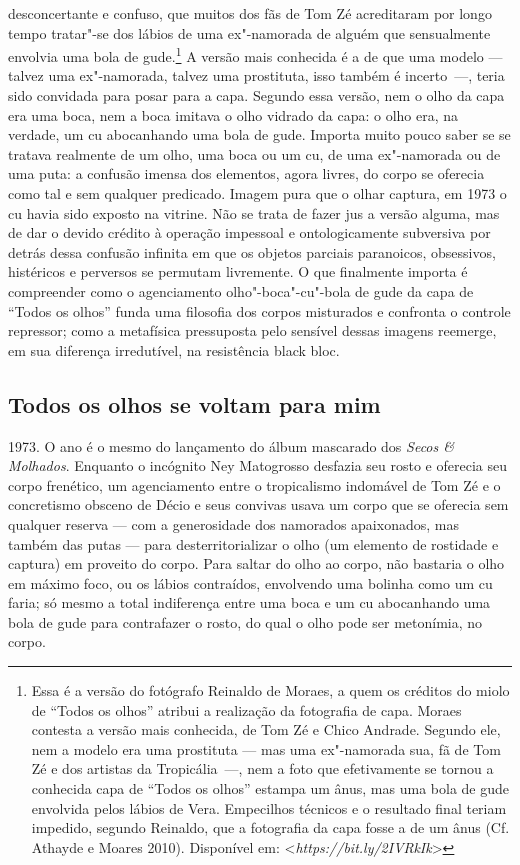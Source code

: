 desconcertante e confuso, que muitos dos fãs de Tom Zé acreditaram por
longo tempo tratar"-se dos lábios de uma ex"-namorada de alguém que
sensualmente envolvia uma bola de gude.\footnote{Essa é
  a versão do fotógrafo Reinaldo de Moraes, a quem os créditos do miolo
  de ``Todos os olhos'' atribui a realização da fotografia de capa.
  Moraes contesta a versão mais conhecida, de Tom Zé e Chico Andrade.
  Segundo ele, nem a modelo era uma prostituta --- mas uma ex"-namorada
  sua, fã de Tom Zé e dos artistas da Tropicália~---, nem a foto que
  efetivamente se tornou a conhecida capa de ``Todos os olhos'' estampa
  um ânus, mas uma bola de gude envolvida pelos lábios de Vera.
  Empecilhos técnicos e o resultado final teriam impedido, segundo
  Reinaldo, que a fotografia da capa fosse a de um ânus (Cf. Athayde e
  Moares 2010). Disponível em:
  \textless{}\emph{https://bit.ly/2IVRkIk}\textgreater{}}
A versão mais conhecida é a de que uma modelo --- talvez uma ex"-namorada,
talvez uma prostituta, isso também é incerto~---, teria sido convidada
para posar para a capa. Segundo essa versão, nem o olho da capa era uma
boca, nem a boca imitava o olho vidrado da capa: o olho era, na verdade,
um cu abocanhando uma bola de gude. Importa muito pouco saber se se
tratava realmente de um olho, uma boca ou um cu, de uma ex"-namorada ou
de uma puta: a confusão imensa dos elementos, agora livres, do corpo se
oferecia como tal e sem qualquer predicado. Imagem pura que o olhar
captura, em 1973 o cu havia sido exposto na vitrine. Não se trata de
fazer jus a versão alguma, mas de dar o devido crédito à operação
impessoal e ontologicamente subversiva por detrás dessa confusão
infinita em que os objetos parciais paranoicos, obsessivos, histéricos e
perversos se permutam livremente. O que finalmente importa é compreender
como o agenciamento olho"-boca"-cu"-bola de gude da capa de ``Todos os
olhos'' funda uma filosofia dos corpos misturados e confronta o controle
repressor; como a metafísica pressuposta pelo sensível dessas imagens
reemerge, em sua diferença irredutível, na resistência black bloc.

\subsection{Todos os olhos se voltam para mim}

1973. O ano é o
mesmo do lançamento do álbum mascarado dos \emph{Secos \& Molhados}.
Enquanto o incógnito Ney Matogrosso desfazia seu rosto e oferecia seu
corpo frenético, um agenciamento entre o tropicalismo indomável de Tom
Zé e o concretismo obsceno de Décio e seus convivas usava um corpo que
se oferecia sem qualquer reserva --- com a generosidade dos namorados
apaixonados, mas também das putas --- para desterritorializar o olho (um
elemento de rostidade e captura) em proveito do corpo. Para saltar do
olho ao corpo, não bastaria o olho em máximo foco, ou os lábios
contraídos, envolvendo uma bolinha como um cu faria; só mesmo a total
indiferença entre uma boca e um cu abocanhando uma bola de gude para
contrafazer o rosto, do qual o olho pode ser metonímia, no corpo.

